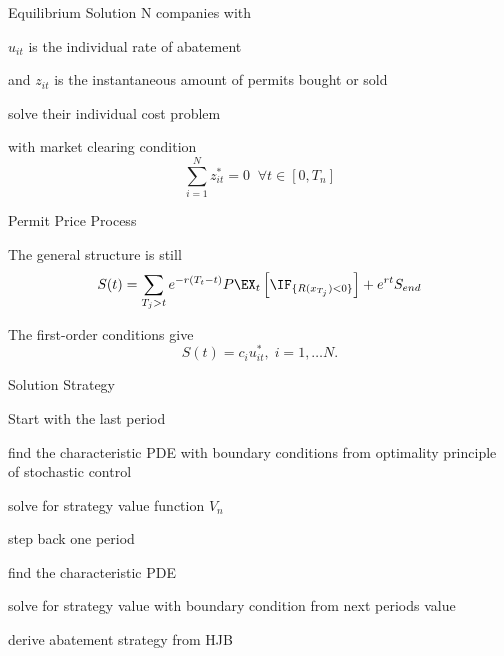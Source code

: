 {Equilibrium Solution}
N companies with




\item<1-> $u_{it}$ is the individual rate of abatement
\item<2-> and $z_{it}$ is the instantaneous amount of permits bought or sold
\item<3-> solve their individual cost problem
\item<4-> with market clearing condition
$$
\sum_{i=1}^N z_{it}^*=0 \;\;  \forall t \in [0, T_n]
$$





{Permit Price Process}




\item<1-> The general structure is still
$$
S(t) = \sum_{T_j >t} e^{-r(T_t-t)} P \EX_t\left[\IF_{\{R(x_{T_j})<0\}}\right] + e^{rt} S_{end}
$$
\item<2-> The first-order conditions give
$$
S(t) = c_i u_{it}^*, \; i=1, \ldots N.
$$





{Solution Strategy}




\item<1-> Start with the last period




\item find the characteristic PDE with boundary conditions from optimality principle of stochastic control
\item solve for strategy value function $V_n$




\item<2-> step back one period




\item find the characteristic PDE
\item solve for strategy value with boundary condition from next periods value




\item<3-> derive abatement strategy from HJB





